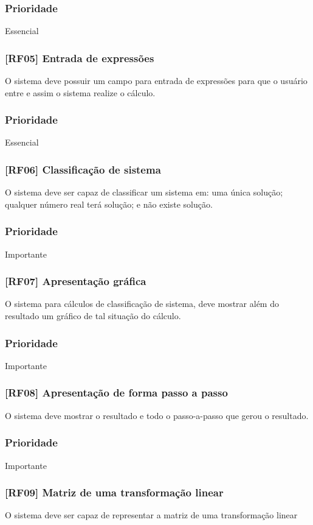 \documentclass{scrreprt}
\begin{document}
\subsubsection{Prioridade}
Essencial

\subsubsection{[RF05] Entrada de expressões}
O sistema deve possuir um campo para entrada de expressões para que o usuário entre e assim o sistema realize o cálculo.
\subsubsection{Prioridade}
Essencial

\subsubsection{[RF06] Classificação de sistema}
O sistema deve ser capaz de classificar um sistema em: uma única solução; qualquer número real terá solução; e não existe solução.
\subsubsection{Prioridade}
Importante

\subsubsection{[RF07] Apresentação gráfica}
O sistema para cálculos de classificação de sistema, deve mostrar além do resultado um gráfico de tal situação do cálculo.
\subsubsection{Prioridade}
Importante

\subsubsection{[RF08] Apresentação de forma passo a passo}
O sistema deve mostrar o resultado e todo o passo-a-passo que gerou o resultado.
\subsubsection{Prioridade}
Importante

\subsubsection{[RF09] Matriz de uma transformação linear }
O sistema deve ser capaz de representar a matriz de uma transformação linear
\end{document}
